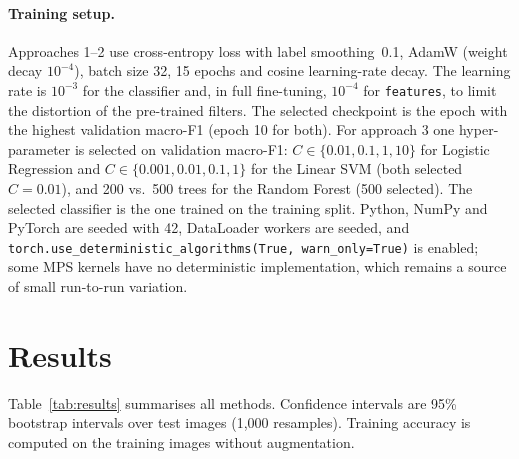 \documentclass[11pt,a4paper]{article}
\begin{document}
\paragraph{Training setup.} Approaches 1--2 use cross-entropy loss with label smoothing~0.1,
AdamW (weight decay $10^{-4}$), batch size 32, 15 epochs and cosine learning-rate decay.
The learning rate is $10^{-3}$ for the classifier and, in full fine-tuning, $10^{-4}$ for
\texttt{features}, to limit the distortion of the pre-trained filters. The selected checkpoint
is the epoch with the highest validation macro-F1 (epoch 10 for both). For approach 3 one
hyper-parameter is selected on validation macro-F1: $C\in\{0.01,0.1,1,10\}$ for Logistic
Regression and $C\in\{0.001,0.01,0.1,1\}$ for the Linear SVM (both selected $C=0.01$), and
200 vs.\ 500 trees for the Random Forest (500 selected). The selected classifier is the
one trained on the training split. Python, NumPy and PyTorch are seeded with 42, DataLoader
workers are seeded, and \texttt{torch.use\_deterministic\_algorithms(True, warn\_only=True)}
is enabled; some MPS kernels have no deterministic implementation, which remains a source of
small run-to-run variation.

\section{Results}
Table~\ref{tab:results} summarises all methods. Confidence intervals are 95\% bootstrap
intervals over test images (1{,}000 resamples). Training accuracy is computed on the
training images without augmentation.
\end{document}
